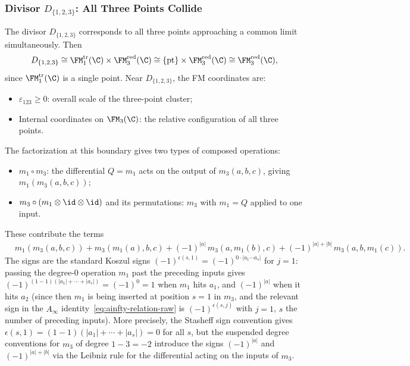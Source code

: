 \subsubsection{Divisor $D_{\{1,2,3\}}$: All Three Points Collide}

\begin{computation}[$D_{\{1,2,3\}}$ contribution]
\label{comp:D123}
The divisor \(D_{\{1,2,3\}}\) corresponds to all three points
approaching a common limit simultaneously. Then
\[
D_{\{1,2,3\}} \cong
\FM_1^{\mathrm{tr}}(\C)\times\FM_3^{\mathrm{red}}(\C)
\cong \{\mathrm{pt}\}\times\FM_3^{\mathrm{red}}(\C)
\cong \FM_3^{\mathrm{red}}(\C),
\]
since \(\FM_1^{\mathrm{tr}}(\C)\) is a single point. Near
\(D_{\{1,2,3\}}\), the FM coordinates are:
\begin{itemize}
\item $\varepsilon_{123} \geq 0$: overall scale of the three-point cluster;
\item Internal coordinates on $\FM_3(\C)$: the relative configuration of all three points.
\end{itemize}
The factorization at this boundary gives two types of composed operations:
\begin{itemize}
\item $m_1 \circ m_3$: the differential $Q = m_1$ acts on the output of $m_3(a,b,c)$, giving $m_1(m_3(a,b,c))$;
\item $m_3 \circ (m_1 \otimes \id \otimes \id)$ and its permutations: $m_3$ with $m_1 = Q$ applied to one input.
\end{itemize}
These contribute the terms
\begin{align*}
&m_1(m_3(a,b,c)) + m_3(m_1(a), b, c) + (-1)^{|a|}\, m_3(a, m_1(b), c) + (-1)^{|a|+|b|}\, m_3(a, b, m_1(c)).
\end{align*}
The signs are the standard Koszul signs $(-1)^{\epsilon(s,1)} = (-1)^{0 \cdot |a_1 \cdots a_s|}$ for $j=1$: passing the degree-$0$ operation $m_1$ past the preceding inputs gives $(-1)^{(1-1)(|a_1|+\cdots+|a_s|)} = (-1)^0 = 1$ when $m_1$ hits $a_1$, and $(-1)^{|a|}$ when it hits $a_2$ (since then $m_1$ is being inserted at position $s=1$ in $m_3$, and the relevant sign in the $A_\infty$ identity~\eqref{eq:ainfty-relation-raw} is $(-1)^{\epsilon(s,j)}$ with $j=1$, $s$ the number of preceding inputs). More precisely, the Stasheff sign convention gives $\epsilon(s,1) = (1-1)(|a_1|+\cdots+|a_s|) = 0$ for all $s$, but the suspended degree conventions for $m_3$ of degree $1-3 = -2$ introduce the signs $(-1)^{|a|}$ and $(-1)^{|a|+|b|}$ via the Leibniz rule for the differential acting on the inputs of $m_3$.
\end{computation}

